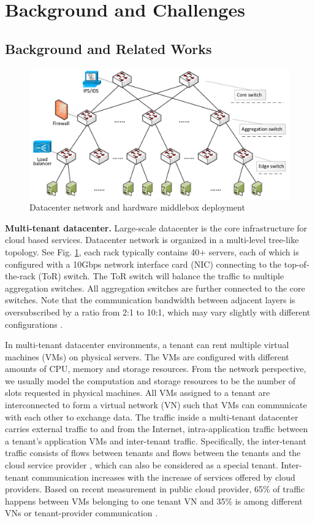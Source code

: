 \documentclass[review]{elsarticle}
\begin{document}
\section{Background and Challenges}\label{sec:background}
\subsection{Background and Related Works}


\begin{figure}
	\centering
	\includegraphics[width=4.5in]{fig/topology.pdf}
	\caption{Datacenter network and hardware middlebox deployment}
	\label{fig:topo}
\end{figure}

\textbf{Multi-tenant datacenter. }
Large-scale datacenter is the core infrastructure for cloud based services. Datacenter network is organized in a multi-level tree-like topology. See Fig. \ref{fig:topo}, each rack typically contains 40+ servers, each of which is configured with a 10Gbps network interface card (NIC) connecting to the top-of-the-rack (ToR) switch. The ToR switch will balance the traffic to multiple aggregation switches. All aggregation switches are further connected to the core switches. Note that the communication bandwidth between adjacent layers is oversubscribed by a ratio from 2:1 to 10:1, which may vary slightly with different configurations \cite{B13cta, williamson2010has, al2008scalable}.

In multi-tenant datacenter environments, a tenant can rent multiple virtual machines (VMs) on physical servers. The VMs are configured with different amounts of CPU, memory and storage resources. From the network perspective, we usually model the computation and storage resources to be the number of slots requested in physical machines. All VMs assigned to a tenant are interconnected to form a virtual network (VN) such that VMs can communicate with each other to exchange data. The traffic inside a multi-tenant datacenter carries external traffic to and from the Internet, intra-application traffic between a tenant's application VMs and inter-tenant traffic. Specifically, the inter-tenant traffic consists of flows between tenants and flows between the tenants and the cloud service provider \cite{B13cta}, which can also be considered as a special tenant. Inter-tenant communication increases with the increase of services offered by cloud providers. Based on recent measurement in public cloud provider, 65\% of traffic happens between VMs belonging to one tenant VN and 35\% is among different VNs or tenant-provider communication \cite{B13cta, P13acs}.
\end{document}
